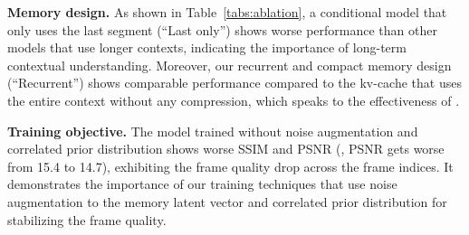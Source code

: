 \vspace{0.02in}
\noindent\textbf{Memory design.}
As shown in Table~\ref{tabs:ablation}, a conditional model that only uses the last segment (``Last only'') shows worse performance than other models that use longer contexts, indicating the importance of long-term contextual understanding. Moreover, our recurrent and compact memory design (``Recurrent'') shows comparable performance compared to the kv-cache that uses the entire context without any compression, which speaks to the effectiveness of \sname.

\vspace{0.02in}
\noindent\textbf{Training objective.}
The model trained without noise augmentation and correlated prior distribution shows worse SSIM and PSNR (\eg, PSNR gets worse from 15.4 to 14.7), exhibiting the frame quality drop across the frame indices. It demonstrates the importance of our training techniques that use noise augmentation to the memory latent vector and correlated prior distribution for stabilizing the frame quality. 

